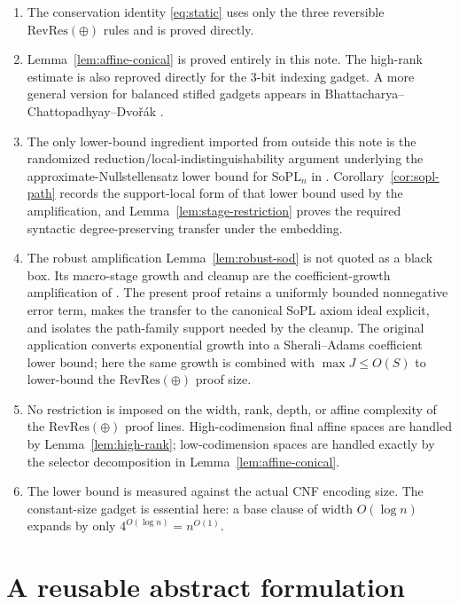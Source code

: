 \documentclass[11pt]{article}
\theoremstyle{definition}
\newcommand{\RevRes}{\mathrm{RevRes}}
\newcommand{\SoPL}{\mathrm{SoPL}}
\begin{document}
\begin{enumerate}[label=\arabic*.]
\item
The conservation identity \eqref{eq:static} uses only the three reversible
$\RevRes(\oplus)$ rules and is proved directly.

\item
Lemma~\ref{lem:affine-conical} is proved entirely in this note.
The high-rank estimate is also reproved directly for the $3$-bit indexing gadget.
A more general version for balanced stifled gadgets appears in
Bhattacharya--Chattopadhyay--Dvo\v{r}\'ak \cite{BCD}.

\item
The only lower-bound ingredient imported from outside this note is the
randomized reduction/local-indistinguishability argument underlying the
approximate-Nullstellensatz lower bound for $\SoPL_n$ in \cite{GHJMPRT}.
Corollary~\ref{cor:sopl-path} records the support-local form of that lower bound used by the amplification, and Lemma~\ref{lem:stage-restriction} proves the required syntactic degree-preserving transfer under the embedding.

\item
The robust amplification Lemma~\ref{lem:robust-sod} is not quoted as a black box.
Its macro-stage growth and cleanup are the coefficient-growth amplification of
\cite[Section~5.1]{GHJMPRT}.  The present proof retains a uniformly bounded
nonnegative error term, makes the transfer to the canonical $\SoPL$ axiom ideal
explicit, and isolates the path-family support needed by the cleanup.  The original
application converts exponential growth into a Sherali--Adams coefficient lower bound;
here the same growth is combined with $\max J\le O(S)$ to lower-bound the
$\RevRes(\oplus)$ proof size.

\item
No restriction is imposed on the width, rank, depth, or affine complexity of the
$\RevRes(\oplus)$ proof lines.  High-codimension final affine spaces are handled by
Lemma~\ref{lem:high-rank}; low-codimension spaces are handled exactly by the
selector decomposition in Lemma~\ref{lem:affine-conical}.

\item
The lower bound is measured against the actual CNF encoding size.
The constant-size gadget is essential here: a base clause of width $O(\log n)$
expands by only $4^{O(\log n)}=n^{O(1)}$.
\end{enumerate}

\section{A reusable abstract formulation}
\end{document}
